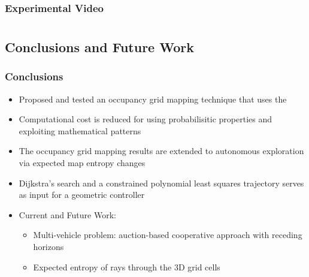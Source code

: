 \documentclass[11pt,professionalfonts,hyperref={pdftex,pdfpagemode=none,pdfstartview=FitH}]{beamer}
\renewcommand{\emph}[1]{\textit{\textbf{\color{blue}{#1}}}}
\begin{document}
\begin{frame}
\frametitle{Experimental Video}

\begin{figure}[ht]
\end{figure}





\end{frame}


\section*{}
\subsection*{Conclusions and Future Work}

\begin{frame}
\frametitle{Conclusions}
\begin{itemize}
        	\item Proposed and tested an occupancy grid mapping technique that uses the \emph{exact probabilistic solution}
	\vspace*{0.0cm}\pause
	\item Computational cost is reduced \emph{substantially} for \emph{real-time implementation} using probabilisitic properties and exploiting mathematical patterns
	\vspace*{0.0cm}\pause
	\item The occupancy grid mapping results are extended to autonomous exploration via expected map entropy changes
	\vspace*{0.0cm}\pause
	\item Dijkstra's search and a constrained polynomial least squares trajectory serves as input for a geometric controller
	\vspace*{0.0cm}\pause
	\item Current and Future Work:
	\begin{itemize}
		\item Multi-vehicle problem: auction-based cooperative approach with receding horizons
		\item Expected entropy of rays through the 3D grid cells
	\end{itemize}
\end{itemize}
\end{frame}
\end{document}
